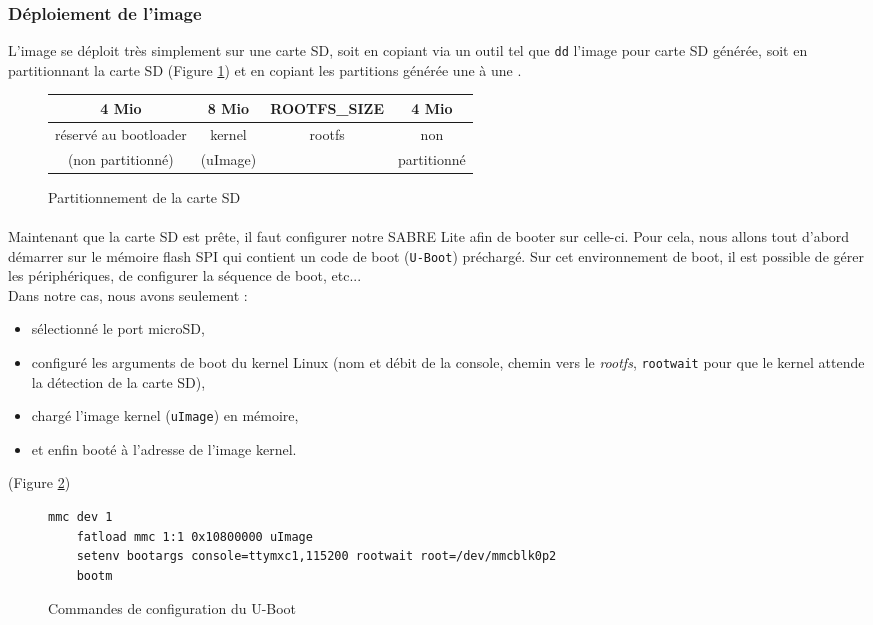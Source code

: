 \subsubsection{Déploiement de l'image}
L'image se déploit très simplement sur une carte SD, soit en copiant via un
outil tel que \texttt{dd} l'image pour carte SD générée, soit en partitionnant
la carte SD (Figure \ref{partSD}) et en copiant les partitions générée une à une
\cite{angolini_yocto_2014}.

\begin{figure}
  \centering
  \begin{tabular}{|c|c|c|c|}
    4 Mio & 8 Mio & ROOTFS\_SIZE & 4 Mio \\
    \hline
    réservé au bootloader & kernel & rootfs & non \\
    (non partitionné) & (uImage) & & partitionné \\
  \end{tabular}
  \caption{Partitionnement de la carte SD}
  \label{partSD}
\end{figure}

\paragraph{} Maintenant que la carte SD est prête, il faut configurer notre
SABRE Lite afin de booter sur celle-ci. Pour cela, nous allons tout d'abord
démarrer sur le mémoire flash SPI qui contient un code de boot
(\texttt{U-Boot}\cite{denk_denx_2015}) préchargé. Sur cet environnement de
boot, il est possible de gérer les périphériques, de configurer la séquence de
boot, etc... \\
Dans notre cas, nous avons seulement :
\begin{itemize}
\renewcommand{\labelitemi}{$\bullet$}
\item sélectionné le port microSD, 
\item configuré les arguments de boot du kernel Linux (nom et débit de la
  console, chemin vers le \textit{rootfs}, \texttt{rootwait} pour que le kernel
  attende la détection de la carte SD),
\item chargé l'image kernel (\texttt{uImage}) en mémoire,
\item et enfin booté à l'adresse de l'image kernel.
\end{itemize}
(Figure \ref{ubootcmds})

\begin{figure}[H]
  \centering
  \begin{lstlisting}[language=bash, frame=single, basicstyle=\scriptsize]
    mmc dev 1
    fatload mmc 1:1 0x10800000 uImage
    setenv bootargs console=ttymxc1,115200 rootwait root=/dev/mmcblk0p2
    bootm
  \end{lstlisting}
  \caption{Commandes de configuration du U-Boot}
  \label{ubootcmds}
\end{figure}

